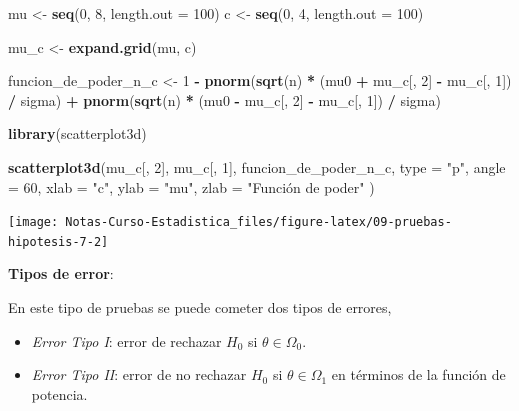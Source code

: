 \documentclass[
  12pt,
]{book}
\newenvironment{Shaded}{\begin{snugshade}}{\end{snugshade}}
\newcommand{\DataTypeTok}[1]{\textcolor[rgb]{0.13,0.29,0.53}{#1}}
\newcommand{\DecValTok}[1]{\textcolor[rgb]{0.00,0.00,0.81}{#1}}
\newcommand{\KeywordTok}[1]{\textcolor[rgb]{0.13,0.29,0.53}{\textbf{#1}}}
\newcommand{\NormalTok}[1]{#1}
\newcommand{\OperatorTok}[1]{\textcolor[rgb]{0.81,0.36,0.00}{\textbf{#1}}}
\newcommand{\StringTok}[1]{\textcolor[rgb]{0.31,0.60,0.02}{#1}}
\begin{document}
\begin{Shaded}
\begin{Highlighting}[]
\NormalTok{mu \textless{}{-}}\StringTok{ }\KeywordTok{seq}\NormalTok{(}\DecValTok{0}\NormalTok{, }\DecValTok{8}\NormalTok{, }\DataTypeTok{length.out =} \DecValTok{100}\NormalTok{)}
\NormalTok{c \textless{}{-}}\StringTok{ }\KeywordTok{seq}\NormalTok{(}\DecValTok{0}\NormalTok{, }\DecValTok{4}\NormalTok{, }\DataTypeTok{length.out =} \DecValTok{100}\NormalTok{)}

\NormalTok{mu\_c \textless{}{-}}\StringTok{ }\KeywordTok{expand.grid}\NormalTok{(mu, c)}

\NormalTok{funcion\_de\_poder\_n\_c \textless{}{-}}\StringTok{ }\DecValTok{1} \OperatorTok{{-}}
\StringTok{  }\KeywordTok{pnorm}\NormalTok{(}\KeywordTok{sqrt}\NormalTok{(n) }\OperatorTok{*}\StringTok{ }\NormalTok{(mu0 }\OperatorTok{+}\StringTok{ }\NormalTok{mu\_c[, }\DecValTok{2}\NormalTok{] }\OperatorTok{{-}}\StringTok{ }\NormalTok{mu\_c[, }\DecValTok{1}\NormalTok{]) }\OperatorTok{/}\StringTok{ }\NormalTok{sigma) }\OperatorTok{+}
\StringTok{  }\KeywordTok{pnorm}\NormalTok{(}\KeywordTok{sqrt}\NormalTok{(n) }\OperatorTok{*}\StringTok{ }\NormalTok{(mu0 }\OperatorTok{{-}}\StringTok{ }\NormalTok{mu\_c[, }\DecValTok{2}\NormalTok{] }\OperatorTok{{-}}\StringTok{ }\NormalTok{mu\_c[, }\DecValTok{1}\NormalTok{]) }\OperatorTok{/}\StringTok{ }\NormalTok{sigma)}

\KeywordTok{library}\NormalTok{(scatterplot3d)}

\KeywordTok{scatterplot3d}\NormalTok{(mu\_c[, }\DecValTok{2}\NormalTok{], mu\_c[, }\DecValTok{1}\NormalTok{], funcion\_de\_poder\_n\_c,}
  \DataTypeTok{type =} \StringTok{"p"}\NormalTok{, }\DataTypeTok{angle =} \DecValTok{60}\NormalTok{,}
  \DataTypeTok{xlab =} \StringTok{"c"}\NormalTok{, }\DataTypeTok{ylab =} \StringTok{"mu"}\NormalTok{, }\DataTypeTok{zlab =} \StringTok{"Función de poder"}
\NormalTok{)}
\end{Highlighting}
\end{Shaded}

\begin{center}\texttt{[image: Notas-Curso-Estadistica\_files/figure-latex/09-pruebas-hipotesis-7-2]} \end{center}

\textbf{Tipos de error}:

En este tipo de pruebas se puede cometer dos tipos de errores,

\begin{itemize}
\item
  \emph{Error Tipo I}: error de rechazar \(H_0\) si \(\theta \in \Omega_0\).
\item
  \emph{Error Tipo II}: error de no rechazar \(H_0\) si \(\theta\in\Omega_1\) en términos de la función de potencia.
\end{itemize}
\end{document}

